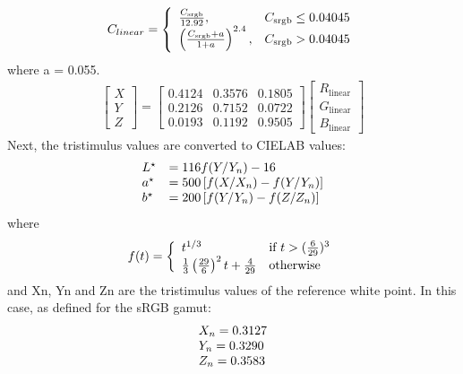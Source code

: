 \begin{eqnarray}
C_{linear} = \left\{
  \begin{array}{l l}
  	\frac{C_\mathrm{srgb}}{12.92}, & C_\mathrm{srgb}\le0.04045\\
	\left(\frac{C_\mathrm{srgb}+a}{1+a}\right)^{2.4}, & C_\mathrm{srgb}>0.04045
  \end{array} \right. 
\end{eqnarray}
where a = 0.055.
\begin{eqnarray}
\begin{bmatrix}
X\\Y\\Z\end{bmatrix}=
\begin{bmatrix}
0.4124&0.3576&0.1805\\
0.2126&0.7152&0.0722\\
0.0193&0.1192&0.9505
\end{bmatrix}
\begin{bmatrix}
R_\mathrm{linear}\\ 
G_\mathrm{linear}\\ 
B_\mathrm{linear}
\end{bmatrix}
\end{eqnarray}
Next, the tristimulus values are converted to CIELAB values:
\begin{eqnarray}
\left.
  \begin{array}{l l}
   L^\star & = 116 f(Y/Y_n) - 16\\
   a^\star & = 500 \left[f(X/X_n) - f(Y/Y_n)\right]\\
   b^\star & = 200 \left[f(Y/Y_n) - f(Z/Z_n)\right]
  \end{array} \right. 
\end{eqnarray}
where 
\begin{eqnarray}
f(t) = \left\{
  \begin{array}{l l}
  t^{1/3} & \text{if } t > (\frac{6}{29})^3 \\
  \frac13 \left( \frac{29}{6} \right)^2 t + \frac{4}{29} & \text{otherwise}
\end{array} \right. 
\end{eqnarray}
and Xn, Yn and Zn are the tristimulus values of the reference white point.  In this case, as defined for the sRGB gamut:
\begin{eqnarray}
\begin{array}{l l}
X_{n} = 0.3127\\
Y_{n} = 0.3290\\
Z_{n} = 0.3583
\end{array}
\end{eqnarray}

